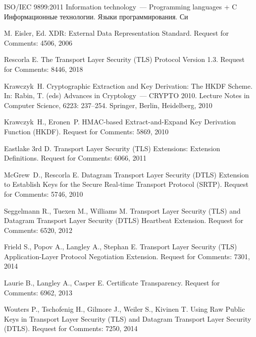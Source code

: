 \clearpage
\begin{thebibliography}{999}
ISO/IEC 9899:2011 
Information technology~--– Programming languages + C\\
{\small Информационные технологии. Языки программирования. Си}

M. Eisler, Ed. 
XDR: External Data Representation Standard. 
Request for Comments: 4506, 2006

Rescorla E.
The Transport Layer Security (TLS) Protocol Version 1.3.
Request for Comments: 8446, 2018

Krawczyk~H. 
Cryptographic Extraction and Key Derivation: The HKDF Scheme. 
In: Rabin, T. (eds) Advances in Cryptology~--- CRYPTO 2010. 
Lecture Notes in Computer Science, 6223: 237--254. 
Springer, Berlin, Heidelberg, 2010

Krawczyk~H., Eronen~P.
HMAC-based Extract-and-Expand Key Derivation Function (HKDF).
Request for Comments: 5869, 2010

Eastlake 3rd D.
Transport Layer Security (TLS) Extensions: Extension Definitions.
Request for Comments: 6066, 2011



McGrew~D., Rescorla E.
Datagram Transport Layer Security (DTLS) Extension to Establish Keys
for the Secure Real-time Transport Protocol (SRTP).
Request for Comments: 5746, 2010

Seggelmann R., Tuexen M., Williams M.
Transport Layer Security (TLS) and Datagram Transport Layer Security (DTLS) 
Heartbeat Extension.
Request for Comments: 6520, 2012

Frield S., Popov A., Langley A., Stephan E.
Transport Layer Security (TLS) Application-Layer Protocol Negotiation 
Extension.
Request for Comments: 7301, 2014

Laurie B., Langley A., Casper E.
Certificate Transparency.
Request for Comments: 6962, 2013

Wouters P., Tschofenig H., Gilmore J., Weiler S., Kivinen T.  
Using Raw Public Keys in Transport Layer Security (TLS)
and Datagram Transport Layer Security (DTLS).
Request for Comments: 7250, 2014


\end{thebibliography}
